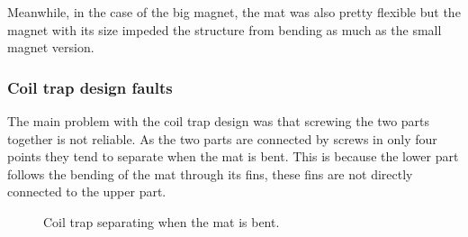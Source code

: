 Meanwhile, in the case of the big magnet, the mat was also pretty flexible but the magnet with its size impeded the structure from bending as much as the small magnet version.

\subsubsection{Coil trap design faults}
The main problem with the coil trap design was that screwing the two parts together is not reliable.
As the two parts are connected by screws in only four points they tend to separate when the mat is bent.
This is because the lower part follows the bending of the mat through its fins, these fins are not directly connected to the upper part.

\begin{figure}
    \centering
    \caption{Coil trap separating when the mat is bent.}
    \label{fig: Coil_trap_separating}
\end{figure}